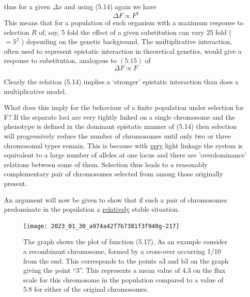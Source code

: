 thus for a given $\Delta x$ and using (5.14) again we have
%
\begin{equation}
\Delta F \propto F^2
\label{eqn:515}
\end{equation}
%
This means that for a population of such organism with a maximum response to selection $R$ of, say, 5 fold the effect of a given substitution can vary 25 fold ( $=5^2$ ) depending on the genetic background. The multiplicative interaction, often used to represent epistatic interaction in theoretical genetics, would give a response to substitution, analogous to $(5.15)$ of
%
\begin{equation}
\Delta F \propto F
\label{eqn:516}
\end{equation}

Clearly the relation (5.14) implies a `stronger' epistatic interaction than does a multiplicative model.

What does this imply for the behaviour of a finite population under selection for F? If the separate loci are very tightly linked on a single chromosome and the phenotype is defined in the dominant epistatic manner of (5.14) then selection will progressively reduce the number of chromosomes until only two or three chromosomal types remain. This is because with \underline{very} light linkage the system is equivalent to a large number of alleles at one locus and there are 'overdominance' relations between some of them. Selection thus leads to a reasonably complementary pair of chromosomes selected from among those originally present.

An argument will now be given to show that if such a pair of chromosomes predominate in the population a \underline{relatively} stable situation.

\begin{figure}
\texttt{[image: 2023\_01\_30\_a974a42f7b7381f3f940g-217]}
\caption{The graph shows the plot of function (5.17). As an example consider a recombinant chromosome, formed by a cross-over occurring 1/10 from the end. This corresponds to the points a3 and b3 on the graph giving the point ``3''. This represents a mean value of 4.3 on the flux scale for this chromosome in the population compared to a value of 5.8 for either of the original chromosomes.
}
\end{figure}


